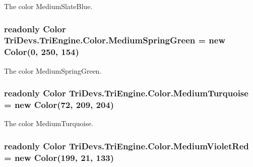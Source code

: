 The color Medium\-Slate\-Blue. 

\hypertarget{struct_tri_devs_1_1_tri_engine_1_1_color_aec2bce9b8cbc0bb272d2244836287639}{
\subsubsection[{Medium\-Spring\-Green}]{\setlength{\rightskip}{0pt plus 5cm}readonly {\bf Color} Tri\-Devs.\-Tri\-Engine.\-Color.\-Medium\-Spring\-Green = new {\bf Color}(0, 250, 154)\hspace{0.3cm}{\ttfamily [static]}}}\label{struct_tri_devs_1_1_tri_engine_1_1_color_aec2bce9b8cbc0bb272d2244836287639}


The color Medium\-Spring\-Green. 

\hypertarget{struct_tri_devs_1_1_tri_engine_1_1_color_a83d738778fe9d11acc80d047de67d1d7}{
\subsubsection[{Medium\-Turquoise}]{\setlength{\rightskip}{0pt plus 5cm}readonly {\bf Color} Tri\-Devs.\-Tri\-Engine.\-Color.\-Medium\-Turquoise = new {\bf Color}(72, 209, 204)\hspace{0.3cm}{\ttfamily [static]}}}\label{struct_tri_devs_1_1_tri_engine_1_1_color_a83d738778fe9d11acc80d047de67d1d7}


The color Medium\-Turquoise. 

\hypertarget{struct_tri_devs_1_1_tri_engine_1_1_color_afbff3bffcc63a1e8e0de69e6720f3600}{
\subsubsection[{Medium\-Violet\-Red}]{\setlength{\rightskip}{0pt plus 5cm}readonly {\bf Color} Tri\-Devs.\-Tri\-Engine.\-Color.\-Medium\-Violet\-Red = new {\bf Color}(199, 21, 133)\hspace{0.3cm}{\ttfamily [static]}}}\label{struct_tri_devs_1_1_tri_engine_1_1_color_afbff3bffcc63a1e8e0de69e6720f3600}


